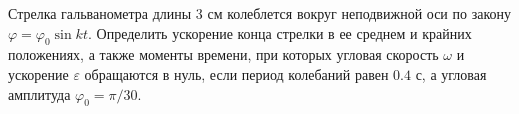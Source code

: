 Стрелка гальванометра длины $3$ см колеблется вокруг неподвижной оси по закону
$\varphi = \varphi _0 \sin{kt}$.
Определить ускорение конца стрелки в ее среднем и крайних положениях,
а также моменты времени, при которых угловая скорость $\omega$ и ускорение
$\varepsilon$ обращаются в нуль, если период колебаний равен $0.4$ с,
а угловая амплитуда $\varphi _0 = \pi/30$.
